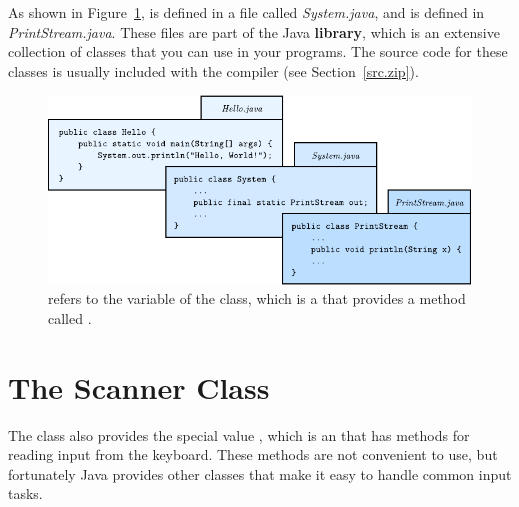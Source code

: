 
As shown in Figure~\ref{fig.system},  is defined in a file called {\it System.java}, and  is defined in {\it PrintStream.java}.
These files are part of the Java {\bf library}, which is an extensive collection of classes that you can use in your programs.
The source code for these classes is usually included with the compiler (see Section~\ref{src.zip}).

\begin{figure}[!ht]
\begin{center}
\includegraphics{figs/system.pdf}
\caption{ refers to the  variable of the  class, which is a  that provides a method called .}
\label{fig.system}
\end{center}
\end{figure}


\section{The Scanner Class}
\label{scanner}


%


The  class also provides the special value , which is an  that has methods for reading input from the keyboard.
These methods are not convenient to use, but fortunately Java provides other classes that make it easy to handle common input tasks.

